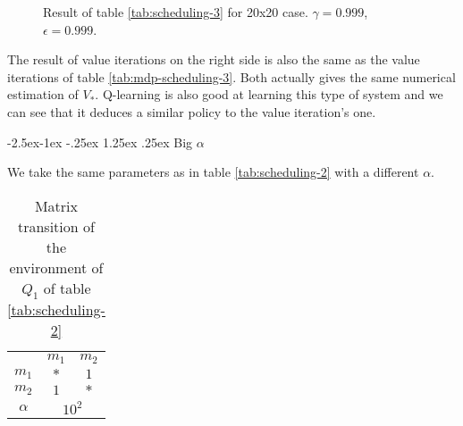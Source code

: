 \documentclass[
  a4paper, xcolor = usenames,dvipsnames]{article}
\makeatletter
\renewcommand\paragraph{\@startsection{paragraph}{4}{\z@}%
  {-2.5ex\@plus -1ex \@minus -.25ex}%
  {1.25ex \@plus .25ex}%
  {\normalfont\normalsize\bfseries}}
\theoremstyle{definition}
\theoremstyle{definition}
\theoremstyle{definition}
\theoremstyle{definition}
\theoremstyle{remark}
\makeatother
\begin{document}
\begin{figure}

{\centering {}

}

\caption{Result of table \ref{tab:scheduling-3} for 20x20 case. \(\gamma = 0.999\), \(\epsilon = 0.999\).}\label{fig:20x20-scheduling-3}
\end{figure}

The result of value iterations on the right side is also the same as the value iterations of table \ref{tab:mdp-scheduling-3}. Both actually gives the same numerical estimation of \(V_{*}\). Q-learning is also good at learning this type of system and we can see that it deduces a similar policy to the value iteration's one.

\hypertarget{big-alpha}{%
\paragraph{\texorpdfstring{Big \(\alpha\)}{Big \textbackslash alpha}}\label{big-alpha}}

We take the same parameters as in table \ref{tab:scheduling-2} with a different \(\alpha\).

\begin{table}[!htbp]
\caption{Matrix transition of the environment of $Q_{1}$ of table \ref{tab:scheduling-2}}
\begin{center}
\begin{tabular}{c c c}
    \hline
    & $m_{1}$ & $m_{2}$ \\
    $m_{1}$ & $*$ & $1$ \\
    $m_{2}$ & $1$ & $*$ \\
    \hline
    $\alpha$ & \multicolumn{2}{c}{$10^{2}$} \\
    \hline
\end{tabular}
\end{center}
\label{tab:scheduling-4-mat-1}
\end{table}
\end{document}

